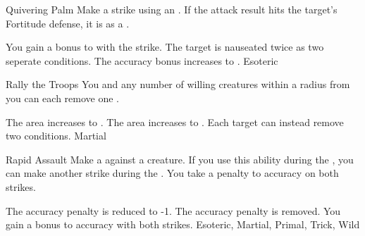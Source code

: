 \lowercase{\hypertarget{maneuver:Quivering Palm}{}}\label{maneuver:Quivering Palm}
\hypertarget{maneuver:Quivering Palm}{}
\begin{apability}{Quivering Palm}
Make a strike using an .
If the attack result hits the target's Fortitude defense,
it is  as a .

\rankline
{} You gain a  bonus to  with the strike.
 The target is nauseated twice as two seperate conditions.
 The accuracy bonus increases to .
 Esoteric
\end{apability}
\vspace{0.25em}



\lowercase{\hypertarget{maneuver:Rally the Troops}{}}\label{maneuver:Rally the Troops}
\hypertarget{maneuver:Rally the Troops}{}
\begin{apability}{Rally the Troops}
You and any number of willing creatures within a \areamed radius from you
can each remove one .

\rankline
{} The area increases to \arealarge.
 The area increases to \areahuge.
 Each target can instead remove two conditions.
 Martial
\end{apability}
\vspace{0.25em}



\lowercase{\hypertarget{maneuver:Rapid Assault}{}}\label{maneuver:Rapid Assault}
\hypertarget{maneuver:Rapid Assault}{}
\begin{apability}{Rapid Assault}
Make a  against a creature.
If you use this ability during the , you can make another strike during the .
You take a  penalty to accuracy on both strikes.

\rankline
{} The accuracy penalty is reduced to -1.
 The accuracy penalty is removed.
 You gain a  bonus to accuracy with both strikes.
 Esoteric, Martial, Primal, Trick, Wild
\end{apability}
\vspace{0.25em}



